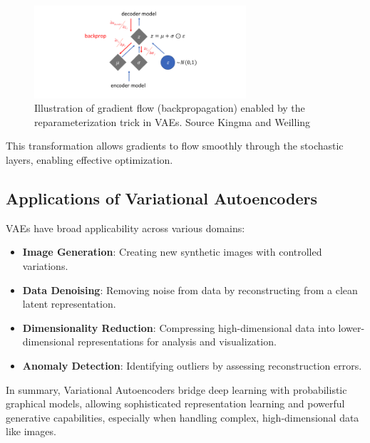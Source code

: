 \begin{figure}[htbp]
    \centering
    \includegraphics[width=0.7\textwidth]{img/vae/reparameterization_backprop.png}
    \caption{Illustration of gradient flow (backpropagation) enabled by the reparameterization trick in VAEs. Source Kingma and Weilling~\cite{Kingma_2019}}
    \label{fig:reparameterization_backprop}
\end{figure}


This transformation allows gradients to flow smoothly through the stochastic layers, enabling effective optimization.






\subsection{Applications of Variational Autoencoders}
VAEs have broad applicability across various domains:

\begin{itemize}
\item \textbf{Image Generation}: Creating new synthetic images with controlled variations.
\item \textbf{Data Denoising}: Removing noise from data by reconstructing from a clean latent representation.
\item \textbf{Dimensionality Reduction}: Compressing high-dimensional data into lower-dimensional representations for analysis and visualization.
\item \textbf{Anomaly Detection}: Identifying outliers by assessing reconstruction errors.
\end{itemize}

In summary, Variational Autoencoders bridge deep learning with probabilistic graphical models, allowing sophisticated representation learning and powerful generative capabilities, especially when handling complex, high-dimensional data like images.



















